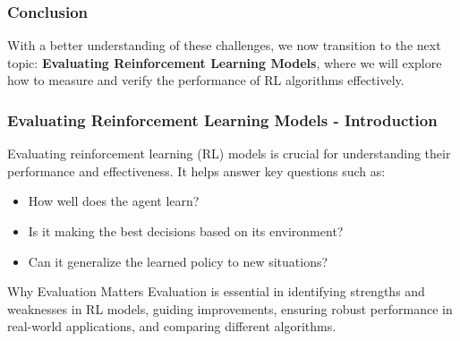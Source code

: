 \documentclass[aspectratio=169]{beamer}
\begin{document}
\begin{frame}
    \frametitle{Conclusion}
    With a better understanding of these challenges, we now transition to the next topic: 
    \textbf{Evaluating Reinforcement Learning Models}, where we will explore how to measure and verify the performance of RL algorithms effectively.
\end{frame}

\begin{frame}[fragile]
    \frametitle{Evaluating Reinforcement Learning Models - Introduction}
    Evaluating reinforcement learning (RL) models is crucial for understanding their performance and effectiveness. It helps answer key questions such as:
    
    \begin{itemize}
        \item How well does the agent learn?
        \item Is it making the best decisions based on its environment?
        \item Can it generalize the learned policy to new situations?
    \end{itemize}
    
    \begin{block}{Why Evaluation Matters}
        Evaluation is essential in identifying strengths and weaknesses in RL models, guiding improvements, ensuring robust performance in real-world applications, and comparing different algorithms.
    \end{block}
\end{frame}
\end{document}
